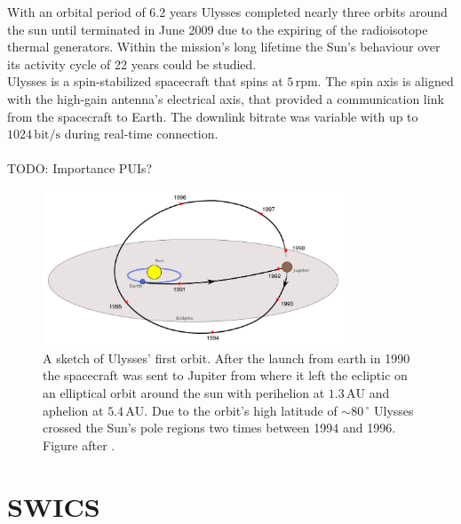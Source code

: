 With an orbital period of 6.2 years Ulysses completed nearly three orbits around the sun until terminated in June 2009 due to the expiring of the radioisotope thermal generators.
Within the mission's long lifetime the Sun's behaviour over its activity cycle of 22 years could be studied.\\
Ulysses is a spin-stabilized spacecraft that spins at $5\,\mathrm{rpm}$. The spin axis is aligned with the high-gain antenna's electrical axis, that provided a communication link from the spacecraft to Earth. The downlink bitrate was variable with up to $1024\,\mathrm{bit/s}$ during real-time connection.
\\ \\ 
TODO: Importance PUIs?
\begin{figure}[h]
	\includegraphics[width=0.8\textwidth]{Figures/ulysses_trajectory.pdf}
	\centering
	\caption{A sketch of Ulysses' first orbit. After the launch from earth in 1990 the spacecraft was sent to Jupiter from where it left the ecliptic on an elliptical orbit around the sun with perihelion at $1.3\,\mathrm{AU}$ and aphelion at $5.4\,\mathrm{AU}$. Due to the orbit's high latitude of $\sim 80 \, ^\circ$ Ulysses crossed the Sun's pole regions two times between 1994 and 1996. Figure after \citet{esa_orbit}.}
	\label{fig:trajectory}
\end{figure}
%
%
%
%
%
\section{SWICS}
\label{sec:swics}



